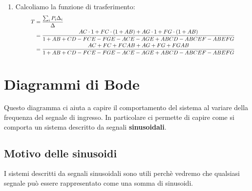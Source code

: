 \documentclass[a4paper]{article}
\begin{document}
\begin{example}
\begin{enumerate}
    \item Calcoliamo la funzione di trasferimento:
      \[\scalebox{0.8}{
          $
            \begin{aligned}
              T &= \frac{\sum_i P_i \Delta_i}{\Delta}\\
                &= \frac{AC \cdot 1 + FC \cdot (1 + AB) + AG \cdot 1 + FG \cdot (1 + AB)}{1 + AB + CD - FCE - FGE - ACE - AGE + ABCD - ABCEF - ABEFG}\\
                &= \frac{AC + FC + FCAB + AG + FG + FGAB}{1 + AB + CD - FCE - FGE - ACE - AGE + ABCD - ABCEF - ABEFG}\\
            \end{aligned}
            $
      }
      \]
  \end{enumerate}
\end{example}

\section{Diagrammi di Bode}
Questo diagramma ci aiuta a capire il comportamento del sistema al variare della
frequenza del segnale di ingresso. In particolare ci permette di capire
come si comporta un sistema descritto da segnali
\textbf{sinusoidali}. 

\subsection{Motivo delle sinusoidi}
I sistemi descritti da segnali sinusoidali sono utili perchè
vedremo che qualsiasi segnale può essere rappresentato come una somma di sinusoidi.
\end{document}
